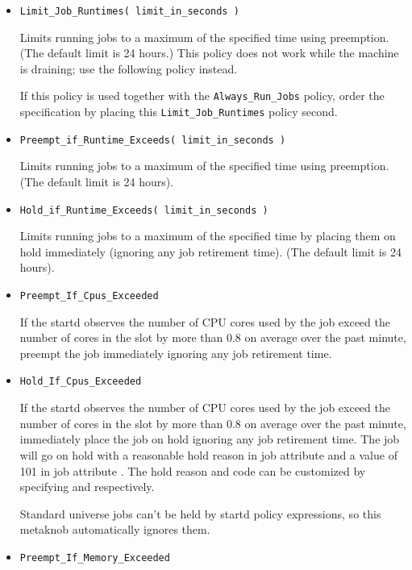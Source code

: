 \begin{description}
\begin{itemize}
    \item \texttt{Limit\_Job\_Runtimes( limit\_in\_seconds )}

    Limits running jobs to a maximum of the specified time using preemption.
	(The default limit is 24 hours.)  This policy does not work while the
	machine is draining; use the following policy instead.

    If this policy is used together with the \texttt{Always\_Run\_Jobs} policy,
    order the specification by placing this \texttt{Limit\_Job\_Runtimes}
    policy second.

	\item \texttt{Preempt\_if\_Runtime\_Exceeds( limit\_in\_seconds )}

	Limits running jobs to a maximum of the specified time
	using preemption.
	(The default limit is 24 hours).

	\item \texttt{Hold\_if\_Runtime\_Exceeds( limit\_in\_seconds )}

	Limits running jobs to a maximum of the specified time
	by placing them on hold immediately (ignoring any job retirement time).
	(The default limit is 24 hours).

	\item \texttt{Preempt\_If\_Cpus\_Exceeded}

	If the startd observes the number of CPU cores used by the job exceed
	the number of cores in the slot by more than 0.8 on average over the past
	minute, preempt the job immediately
	ignoring any job retirement time.

	\item \texttt{Hold\_If\_Cpus\_Exceeded}

	If the startd observes the number of CPU cores used by the job exceed
	the number of cores in the slot by more than 0.8 on average over the past
	minute, immediately place the job on hold
	ignoring any job retirement time.  The job will go on hold with a reasonable
	hold reason in job attribute  and a value of 101 in job
	attribute .  The hold reason and code can be customized by
	specifying  and
	 respectively.

	Standard universe jobs can't be held by startd policy expressions,
	so this metaknob automatically ignores them.

	\item \texttt{Preempt\_If\_Memory\_Exceeded}


\end{itemize}
\end{description}
